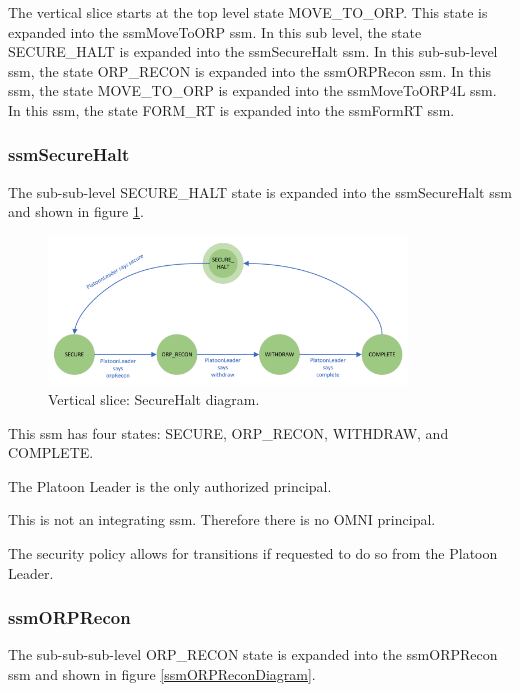 \documentclass[../../main/main.tex]{subfiles}
\begin{document}
The vertical slice starts at the top level state MOVE_TO_ORP.  This state is expanded into the ssmMoveToORP \gls{ssm}. In this sub level, the state SECURE_HALT is expanded into the ssmSecureHalt \gls{ssm}.  In this sub-sub-level \gls{ssm}, the state ORP_RECON is expanded into the ssmORPRecon \gls{ssm}.  In this \gls{ssm}, the state MOVE_TO_ORP is expanded into the ssmMoveToORP4L \gls{ssm}.  In this \gls{ssm}, the state FORM_RT is expanded into the ssmFormRT \gls{ssm}.  

\clearpage
\subsubsection{ssmSecureHalt}\label{sssec:ssmSecureHalt}
The sub-sub-level SECURE_HALT state is expanded into the ssmSecureHalt \gls{ssm} and shown in figure \ref{ssmSecurtHaltDiagram}.

\begin{figure}[h!]
\centering
\includegraphics[width=0.85\textwidth]{../figures/ssmSecurtHaltDiagram}
\caption{\label{ssmSecurtHaltDiagram} Vertical slice: SecureHalt diagram.}
\end{figure}

This \gls{ssm} has four states: SECURE, ORP_RECON, WITHDRAW, and COMPLETE.  

The Platoon Leader is the only authorized principal.

This is not an integrating \gls{ssm}.  Therefore there is no OMNI principal.  

The security policy allows for transitions if requested to do so from the Platoon Leader.  

\clearpage

\subsubsection{ssmORPRecon}\label{sssec:ssmORPRecon}
The sub-sub-sub-level ORP_RECON state is expanded into the ssmORPRecon \gls{ssm} and shown in figure \ref{ssmORPReconDiagram}.
\end{document}
